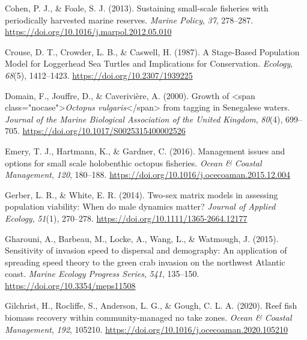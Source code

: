 \documentclass[
]{article}
\newlength{\cslhangindent}
\newlength{\cslentryspacingunit} %
\newenvironment{CSLReferences}[2] %
 {%
  \setlength{\parindent}{0pt}
  \ifodd #1
  \let\oldpar\par
  \def\par{\hangindent=\cslhangindent\oldpar}
  \fi
  \setlength{\parskip}{#2\cslentryspacingunit}
 }%
 {}
\begin{document}
\begin{CSLReferences}{1}{2}
\leavevmode{}%
Cohen, P. J., \& Foale, S. J. (2013). Sustaining small-scale fisheries with periodically harvested marine reserves. \emph{Marine Policy}, \emph{37}, 278--287. \url{https://doi.org/10.1016/j.marpol.2012.05.010}

\leavevmode{}%
Crouse, D. T., Crowder, L. B., \& Caswell, H. (1987). A {Stage}-{Based} {Population} {Model} for {Loggerhead} {Sea} {Turtles} and {Implications} for {Conservation}. \emph{Ecology}, \emph{68}(5), 1412--1423. \url{https://doi.org/10.2307/1939225}

\leavevmode{}%
Domain, F., Jouffre, D., \& Caverivière, A. (2000). Growth of {\textless{}}span class="nocase"{\textgreater{}}\emph{{Octopus} vulgaris}{\textless{}}/span{\textgreater{}} from tagging in {Senegalese} waters. \emph{Journal of the Marine Biological Association of the United Kingdom}, \emph{80}(4), 699--705. \url{https://doi.org/10.1017/S0025315400002526}

\leavevmode{}%
Emery, T. J., Hartmann, K., \& Gardner, C. (2016). Management issues and options for small scale holobenthic octopus fisheries. \emph{Ocean \& Coastal Management}, \emph{120}, 180--188. \url{https://doi.org/10.1016/j.ocecoaman.2015.12.004}

\leavevmode{}%
Gerber, L. R., \& White, E. R. (2014). Two-sex matrix models in assessing population viability: When do male dynamics matter? \emph{Journal of Applied Ecology}, \emph{51}(1), 270--278. \url{https://doi.org/10.1111/1365-2664.12177}

\leavevmode{}%
Gharouni, A., Barbeau, M., Locke, A., Wang, L., \& Watmough, J. (2015). Sensitivity of invasion speed to dispersal and demography: An application of spreading speed theory to the green crab invasion on the northwest {Atlantic} coast. \emph{Marine Ecology Progress Series}, \emph{541}, 135--150. \url{https://doi.org/10.3354/meps11508}

\leavevmode{}%
Gilchrist, H., Rocliffe, S., Anderson, L. G., \& Gough, C. L. A. (2020). Reef fish biomass recovery within community-managed no take zones. \emph{Ocean \& Coastal Management}, \emph{192}, 105210. \url{https://doi.org/10.1016/j.ocecoaman.2020.105210}


\end{CSLReferences}
\end{document}
